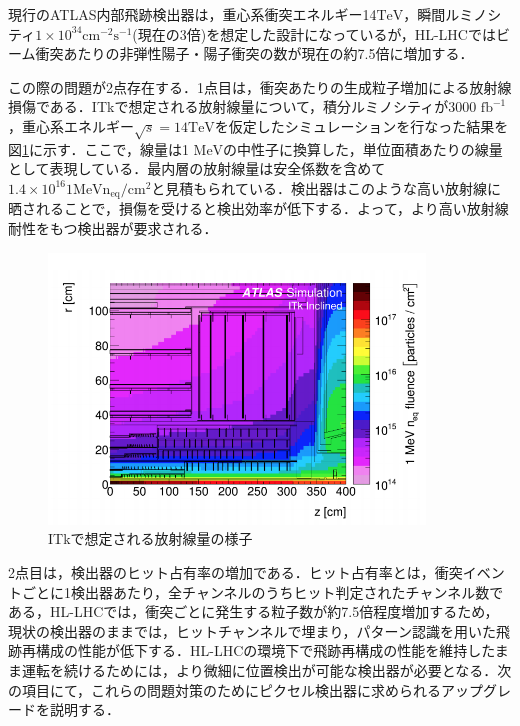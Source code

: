 現行のATLAS内部飛跡検出器は，重心系衝突エネルギー14$\mathrm{TeV}$，瞬間ルミノシティ$1 \times 10^34 \mathrm{cm^{-2} s^{-1}}$(現在の3倍)を想定した設計になっているが，HL-LHCではビーム衝突あたりの非弾性陽子・陽子衝突の数が現在の約7.5倍に増加する．\par
この際の問題が2点存在する．1点目は，衝突あたりの生成粒子増加による放射線損傷である．ITkで想定される放射線量について，積分ルミノシティが3000 $\mathrm{fb^{-1}}$，重心系エネルギー$\sqrt{s} = 14 \mathrm{TeV}$を仮定したシミュレーションを行なった結果を図\ref{fig:radi}に示す．ここで，線量は1 $\mathrm{MeV}$の中性子に換算した，単位面積あたりの線量として表現している．最内層の放射線量は安全係数を含めて$1.4 \times 10^{16} \mathrm{1MeV n_{eq}/cm^{2}}$と見積もられている．検出器はこのような高い放射線に晒されることで，損傷を受けると検出効率が低下する．よって，より高い放射線耐性をもつ検出器が要求される．\par

\begin{figure}[h]
  \centering
  \includegraphics[width=10cm]{./figure/radi.png}
  \caption{ITkで想定される放射線量の様子\cite{Collaboration:2257755}}
  \label{fig:radi}
\end{figure}



2点目は，検出器のヒット占有率の増加である．ヒット占有率とは，衝突イベントごとに1検出器あたり，全チャンネルのうちヒット判定されたチャンネル数である，HL-LHCでは，衝突ごとに発生する粒子数が約7.5倍程度増加するため，現状の検出器のままでは，ヒットチャンネルで埋まり，パターン認識を用いた飛跡再構成の性能が低下する．HL-LHCの環境下で飛跡再構成の性能を維持したまま運転を続けるためには，より微細に位置検出が可能な検出器が必要となる．次の項目にて，これらの問題対策のためにピクセル検出器に求められるアップグレードを説明する．\par

